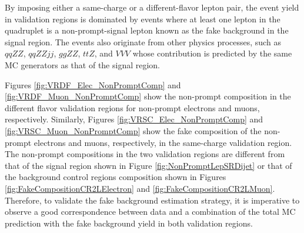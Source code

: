 By imposing either a same-charge or a different-flavor lepton pair, the event yield in validation regions is dominated by events where at least one lepton in the quadruplet is a non-prompt-signal lepton known as the fake background in the signal region. The events also originate from other physics processes, such as $qqZZ$, $qqZZjj$, $ggZZ$, $ttZ$, and $VVV$ whose contribution is predicted by the same MC generators as that of the signal region.

Figures \ref{fig:VRDF_Elec_NonPromptComp} and \ref{fig:VRDF_Muon_NonPromptComp} show the non-prompt composition in the different flavor validation regions for non-prompt electrons and muons, respectively. Similarly, Figures \ref{fig:VRSC_Elec_NonPromptComp} and \ref{fig:VRSC_Muon_NonPromptComp} show the fake composition of the non-prompt electrons and muons, respectively, in the same-charge validation region. The non-prompt compositions in the two validation regions are different from that of the signal region shown in Figure \ref{fig:NonPromptLepSRDijet} or that of the background control regions composition shown in Figures \ref{fig:FakeCompositionCR2LElectron} and \ref{fig:FakeCompositionCR2LMuon}. Therefore, to validate the fake background estimation strategy, it is imperative to observe a good correspondence between data and a combination of the total MC prediction with the fake background yield in both validation regions.

